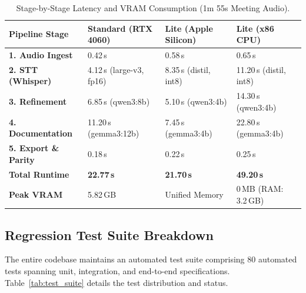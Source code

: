 \documentclass[10pt,a4paper]{article}
\begin{document}
\begin{table}[h]
\centering
\caption{Stage-by-Stage Latency and VRAM Consumption (1m 55s Meeting Audio).}
\label{tab:latency_benchmarks}
\small
\begin{tabularx}{\columnwidth}{l X X X}
\toprule
\textbf{Pipeline Stage} & \textbf{Standard (RTX 4060)} & \textbf{Lite (Apple Silicon)} & \textbf{Lite (x86 CPU)} \\
\midrule
\textbf{1. Audio Ingest} & 0.42\,s & 0.58\,s & 0.65\,s \\
\textbf{2. STT (Whisper)} & 4.12\,s (large-v3, fp16) & 8.35\,s (distil, int8) & 11.20\,s (distil, int8) \\
\textbf{3. Refinement} & 6.85\,s (qwen3:8b) & 5.10\,s (qwen3:4b) & 14.30\,s (qwen3:4b) \\
\textbf{4. Documentation} & 11.20\,s (gemma3:12b) & 7.45\,s (gemma3:4b) & 22.80\,s (gemma3:4b) \\
\textbf{5. Export \& Parity} & 0.18\,s & 0.22\,s & 0.25\,s \\
\midrule
\textbf{Total Runtime} & \textbf{22.77\,s} & \textbf{21.70\,s} & \textbf{49.20\,s} \\
\textbf{Peak VRAM} & 5.82\,GB & Unified Memory & 0\,MB (RAM: 3.2\,GB) \\
\bottomrule
\end{tabularx}
\end{table}

\subsection{Regression Test Suite Breakdown}
The entire codebase maintains an automated test suite comprising 80 automated tests spanning unit, integration, and end-to-end specifications. Table~\ref{tab:test_suite} details the test distribution and status.
\end{document}
